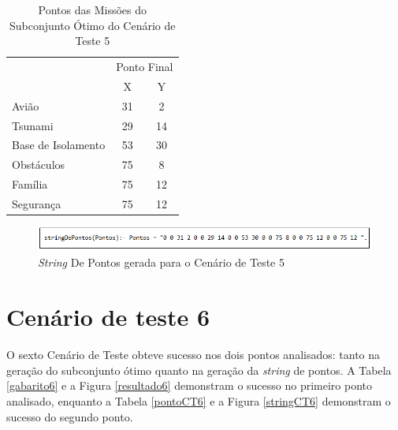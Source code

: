 \begin{table}[!h]
\centering
\caption{Pontos das Missões do Subconjunto Ótimo do Cenário de Teste 5}
\label{pontoCT5}
\begin{tabular}{lcc}
\rowcolor[HTML]{00D2CB} 
\multicolumn{1}{c}{\cellcolor[HTML]{00D2CB}} & \multicolumn{2}{l}{\cellcolor[HTML]{00D2CB}Ponto Final} \\ 
\rowcolor[HTML]{C0F2F0} 
\multicolumn{1}{c}{\cellcolor[HTML]{00D2CB}Missão} & \multicolumn{1}{c}{\cellcolor[HTML]{C0F2F0}X} & \multicolumn{1}{c}{\cellcolor[HTML]{C0F2F0}Y} \\
 Avião & 31 & 2 \\
 Tsunami & 29 & 14 \\
 Base de Isolamento & 53 & 30 \\
 Obstáculos & 75 & 8 \\
 Família & 75 & 12 \\
 Segurança & 75 & 12    \\          
\end{tabular}
\end{table}


\FloatBarrier
\begin{figure}[!h]
\centering
\includegraphics[keepaspectratio=true,scale=0.7]{figuras/stringCT5.png}
\caption{\textit{String} De Pontos gerada para o Cenário de Teste 5}
\label{stringCT5}
\end{figure}



\section{Cenário de teste 6}

	O sexto Cenário de Teste obteve sucesso nos dois pontos analisados: tanto na geração do subconjunto ótimo quanto na geração da \textit{string} de pontos. A Tabela \ref{gabarito6} e a Figura \ref{resultado6} demonstram o sucesso no primeiro ponto analisado, enquanto a Tabela \ref{pontoCT6} e a Figura \ref{stringCT6} demonstram o sucesso do segundo ponto.

